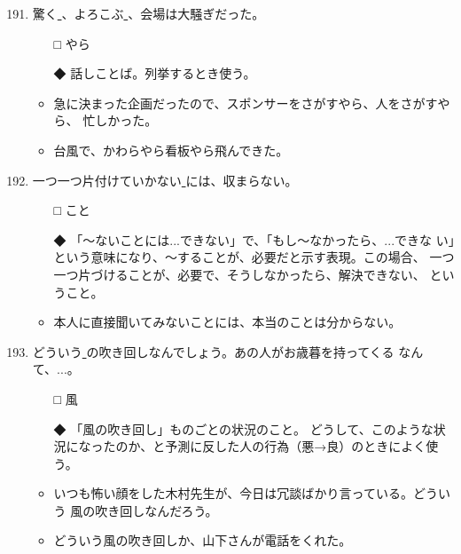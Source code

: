 \documentclass[
uplatex,
b5paper,
10pt,
dvipdfmx
]{jsbook}
\begin{document}
\begin{enumerate}
\setcounter{enumi}{190}
\item 驚く\underline{   }、よろこぶ\underline{   }、会場は大騒ぎだった。
\begin{itemize}
\item[□] やら
\item[◆] 話しことば。列挙するとき使う。
\end{itemize}
\begin{itemize}
\item 急に決まった企画だったので、スポンサーをさがすやら、人をさがすやら、
      忙しかった。
\item 台風で、かわらやら看板やら飛んできた。
\end{itemize}

\item 一つ一つ片付けていかない\underline{   }には、収まらない。
\begin{itemize}
\item[□] こと
\item[◆] 「〜ないことには...できない」で、「もし〜なかったら、...できな
	  い」という意味になり、〜することが、必要だと示す表現。この場合、
	  一つ一つ片づけることが、必要で、そうしなかったら、解決できない、
	  ということ。
\end{itemize}
\begin{itemize}
\item 本人に直接聞いてみないことには、本当のことは分からない。
\end{itemize}

\item どういう\underline{  }の吹き回しなんでしょう。あの人がお歳暮を持ってくる
      なんて、...。
\begin{itemize}
\item[□] 風
\item[◆] 「風の吹き回し」ものごとの状況のこと。 どうして、このような状
	  況になったのか、と予測に反した人の行為（悪→良）のときによく使
	  う。
\end{itemize}
\begin{itemize}
\item いつも怖い顔をした木村先生が、今日は冗談ばかり言っている。どういう
      風の吹き回しなんだろう。
\item どういう風の吹き回しか、山下さんが電話をくれた。
\end{itemize}
  

\end{enumerate}
\end{document}
